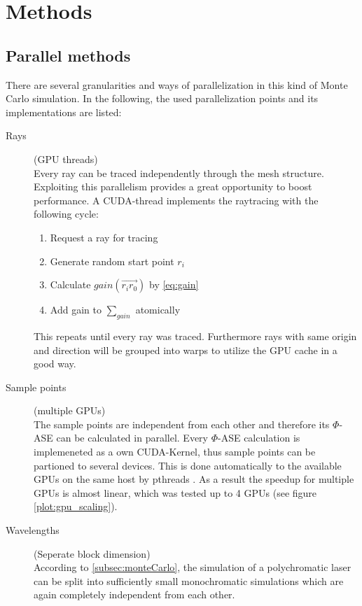 \section{Methods}
\subsection{Parallel methods}
There are several granularities and ways of parallelization in this kind of 
Monte Carlo simulation. In the following, the used parallelization points and
its implementations are listed:

\begin{description}

\item[Rays] (GPU threads)\\
    Every ray can be traced independently through the mesh structure.
    Exploiting this parallelism provides a great opportunity to boost
    performance. A CUDA-thread implements the raytracing with the 
    following cycle:
    \begin{enumerate}
      \item Request a ray for tracing
      \item Generate random start point $r_i$
      \item Calculate $gain(\overrightarrow{r_ir_0})$ by \eqref{eq:gain}
      \item Add gain to $\sum_{gain}$ atomically
    \end{enumerate}
    This repeats until every ray was traced. Furthermore rays with same
    origin and direction will be grouped into warps to utilize the
    GPU cache in a good way.

  \item[Sample points] (multiple GPUs)\\
    The sample points are independent from each other
    and therefore its $\Phi$-ASE can be calculated in parallel. Every $\Phi$-ASE
    calculation is implemeneted as a own CUDA-Kernel, thus sample points can be partioned 
    to several devices. This is done automatically to the available GPUs on
    the same host by pthreads \cite{pthreads}. As a result the speedup for multiple
    GPUs is almost linear, which was tested up to 4 GPUs (see figure \ref{plot:gpu_scaling}).

  \item[Wavelengths] (Seperate block dimension)\\
    According to \ref{subsec:monteCarlo}, the simulation of a polychromatic
    laser can be split into sufficiently small monochromatic simulations which
    are again completely independent from each other.

\end{description}

